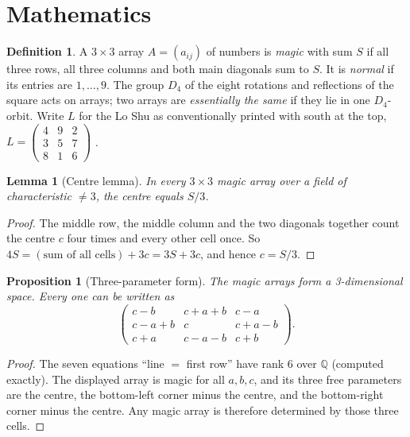 \documentclass[journal]{IEEEtran}
\newtheorem{lemma}[theorem]{Lemma}
\newtheorem{proposition}[theorem]{Proposition}
\theoremstyle{definition}
\newtheorem{definition}{Definition}
\newcommand{\sq}[9]{\begin{smallmatrix}#1&#2&#3\\#4&#5&#6\\#7&#8&#9\end{smallmatrix}}
\begin{document}
\section{Mathematics}
\label{sec:math}

\begin{definition}
A $3\times3$ array $A=(a_{ij})$ of numbers is \emph{magic} with sum $S$ if all three rows, all three columns and both main diagonals sum to $S$. It is \emph{normal} if its entries are $1,\dots,9$. The group $D_4$ of the eight rotations and reflections of the square acts on arrays; two arrays are \emph{essentially the same} if they lie in one $D_4$-orbit. Write $L$ for the Lo Shu as conventionally printed with south at the top, $L=\left(\sq{4}{9}{2}{3}{5}{7}{8}{1}{6}\right)$ \cite{cammann1961,wiki_luoshu}.
\end{definition}

\begin{lemma}[Centre lemma]\label{lem:centre}
In every $3\times3$ magic array over a field of characteristic $\neq3$, the centre equals $S/3$.
\end{lemma}
\begin{proof}
The middle row, the middle column and the two diagonals together count the centre $c$ four times and every other cell once. So $4S=(\text{sum of all cells})+3c=3S+3c$, and hence $c=S/3$.
\end{proof}

\begin{proposition}[Three-parameter form]\label{prop:lucas}
The magic arrays form a 3-dimensional space. Every one can be written as
\[\begin{pmatrix}c-b&c+a+b&c-a\\c-a+b&c&c+a-b\\c+a&c-a-b&c+b\end{pmatrix}.\]
\end{proposition}
\begin{proof}
The seven equations ``line $=$ first row'' have rank $6$ over $\mathbb{Q}$ (computed exactly). The displayed array is magic for all $a,b,c$, and its three free parameters are the centre, the bottom-left corner minus the centre, and the bottom-right corner minus the centre. Any magic array is therefore determined by those three cells.
\end{proof}
\end{document}
